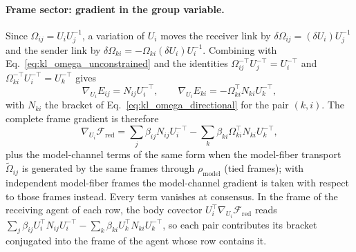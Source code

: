 \documentclass[11pt]{article}
\begin{document}
\paragraph{Frame sector: gradient in the group variable.}
Since $\Omega_{ij} = U_iU_j^{-1}$, a variation of $U_i$ moves the receiver link by $\delta\Omega_{ij} = (\delta U_i)U_j^{-1}$ and the sender link by $\delta\Omega_{ki} = -\Omega_{ki}(\delta U_i)U_i^{-1}$. Combining with Eq.~\eqref{eq:kl_omega_unconstrained} and the identities $\Omega_{ij}^{-\top}U_j^{-\top} = U_i^{-\top}$ and $\Omega_{ki}^{-\top}U_i^{-\top} = U_k^{-\top}$ gives
\begin{equation}
\nabla_{U_i}E_{ij} = N_{ij}U_i^{-\top},
\qquad
\nabla_{U_i}E_{ki} = -\Omega_{ki}^{\top}N_{ki}U_k^{-\top},
\end{equation}
with $N_{ki}$ the bracket of Eq.~\eqref{eq:kl_omega_directional} for the pair $(k, i)$. The complete frame gradient is therefore
\begin{equation}
\nabla_{U_i}\mathcal{F}_{\mathrm{red}} = \sum_j \beta_{ij}N_{ij}U_i^{-\top} - \sum_k \beta_{ki}\Omega_{ki}^{\top}N_{ki}U_k^{-\top},
\label{eq:canonical_gradient_frame}
\end{equation}
plus the model-channel terms of the same form when the model-fiber transport $\tilde\Omega_{ij}$ is generated by the same frames through $\rho_{\mathrm{model}}$ (tied frames); with independent model-fiber frames the model-channel gradient is taken with respect to those frames instead. Every term vanishes at consensus. In the frame of the receiving agent of each row, the body covector $U_i^\top\nabla_{U_i}\mathcal{F}_{\mathrm{red}}$ reads $\sum_j\beta_{ij}U_i^\top N_{ij}U_i^{-\top} - \sum_k\beta_{ki}U_k^\top N_{ki}U_k^{-\top}$, so each pair contributes its bracket conjugated into the frame of the agent whose row contains it.
\end{document}
